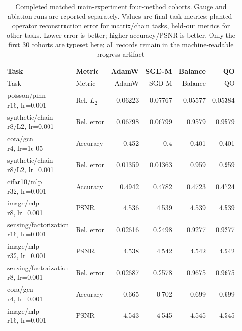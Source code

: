 \begin{longtable}{p{.31\linewidth}p{.13\linewidth}rrrr}
\caption{Completed matched main-experiment four-method cohorts. Gauge and ablation runs are reported separately. Values are final task metrics: planted-operator reconstruction error for matrix/chain tasks, held-out metrics for other tasks. Lower error is better; higher accuracy/PSNR is better. Only the first 30 cohorts are typeset here; all records remain in the machine-readable progress artifact.}\label{tab:new-results}\\
\toprule Task & Metric & AdamW & SGD-M & Balance & QO \\ \midrule\endfirsthead
\toprule Task & Metric & AdamW & SGD-M & Balance & QO \\ \midrule\endhead
\shortstack[l]{poisson/pinn\\r16, lr=0.001} & Rel. $L_2$ & 0.06223 & 0.07767 & 0.05577 & 0.05384\\
\shortstack[l]{synthetic/chain\\r8/L2, lr=0.001} & Rel. error & 0.06798 & 0.06799 & 0.9579 & 0.9579\\
\shortstack[l]{cora/gcn\\r4, lr=1e-05} & Accuracy & 0.452 & 0.4 & 0.401 & 0.401\\
\shortstack[l]{synthetic/chain\\r8/L2, lr=0.001} & Rel. error & 0.01359 & 0.01363 & 0.959 & 0.959\\
\shortstack[l]{cifar10/mlp\\r32, lr=0.001} & Accuracy & 0.4942 & 0.4782 & 0.4723 & 0.4724\\
\shortstack[l]{image/mlp\\r8, lr=0.001} & PSNR & 4.536 & 4.539 & 4.539 & 4.539\\
\shortstack[l]{sensing/factorization\\r16, lr=0.001} & Rel. error & 0.02616 & 0.2498 & 0.9277 & 0.9277\\
\shortstack[l]{image/mlp\\r32, lr=0.001} & PSNR & 4.538 & 4.542 & 4.542 & 4.542\\
\shortstack[l]{sensing/factorization\\r8, lr=0.001} & Rel. error & 0.02687 & 0.2578 & 0.9675 & 0.9675\\
\shortstack[l]{cora/gcn\\r4, lr=0.001} & Accuracy & 0.665 & 0.702 & 0.699 & 0.699\\
\shortstack[l]{image/mlp\\r16, lr=0.001} & PSNR & 4.543 & 4.545 & 4.545 & 4.545\\

\end{longtable}

